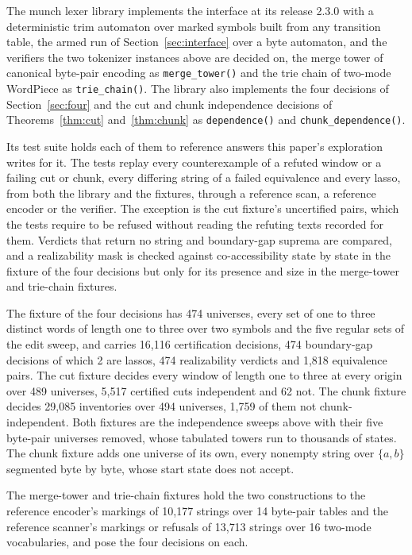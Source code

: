 \documentclass[11pt,a4paper]{article}
\theoremstyle{definition}
\theoremstyle{plain}
\newcommand{\code}[1]{\texttt{#1}}
\begin{document}
The munch lexer library \citep{munch} implements the interface at its release 2.3.0 with a deterministic trim automaton
over marked symbols built from any transition table, the armed run of Section~\ref{sec:interface} over a byte automaton,
and the verifiers the two tokenizer instances above are decided on, the merge tower of canonical byte-pair encoding as
\code{merge\_tower()} and the trie chain of two-mode WordPiece as \code{trie\_chain()}. The library also implements the
four decisions of Section~\ref{sec:four} and the cut and chunk independence decisions of Theorems~\ref{thm:cut}
and~\ref{thm:chunk} as \code{dependence()} and \code{chunk\_dependence()}.

Its test suite holds each of them to reference answers this paper's exploration writes for it. The tests replay every
counterexample of a refuted window or a failing cut or chunk, every differing string of a failed equivalence and every
lasso, from both the library and the fixtures, through a reference scan, a reference encoder or the verifier. The
exception is the cut fixture's uncertified pairs, which the tests require to be refused without reading the refuting
texts recorded for them. Verdicts that return no string and boundary-gap suprema are compared, and a realizability mask
is checked against co-accessibility state by state in the fixture of the four decisions but only for its presence and
size in the merge-tower and trie-chain fixtures.

The fixture of the four decisions has 474 universes, every set of one to three distinct words of length one to three
over two symbols and the five regular sets of the edit sweep, and carries 16{,}116 certification decisions, 474
boundary-gap decisions of which 2 are lassos, 474 realizability verdicts and 1{,}818 equivalence pairs. The cut fixture
decides every window of length one to three at every origin over 489 universes, 5{,}517 certified cuts independent and
62 not. The chunk fixture decides 29{,}085 inventories over 494 universes, 1{,}759 of them not chunk-independent. Both
fixtures are the independence sweeps above with their five byte-pair universes removed, whose tabulated towers run to
thousands of states. The chunk fixture adds one universe of its own, every nonempty string over $\{a, b\}$ segmented
byte by byte, whose start state does not accept.

The merge-tower and trie-chain fixtures hold the two constructions to the reference encoder's markings of 10{,}177
strings over 14 byte-pair tables and the reference scanner's markings or refusals of 13{,}713 strings over 16 two-mode
vocabularies, and pose the four decisions on each.
\end{document}
